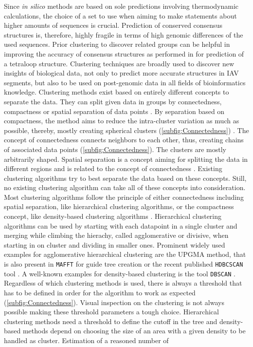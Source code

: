 \vspace{1em}

Since \textit{in silico} methods are based on sole predictions involving thermodynamic calculations, the choice of a set to use when aiming to make statements about higher amounts of sequences is crucial. Prediction of conserved consensus structures is, therefore, highly fragile in terms of high genomic differences of the used sequences. Prior clustering to discover related groups can be helpful in improving the accuracy of consensus structures as performed in \textcite{moss_identification_2011} for prediction of a tetraloop structure. Clustering techniques are broadly used to discover new insights of biological data, not only to predict more accurate structures in \gls{IAV} segments, but also to be used on post-genomic data in all fields of bioinformatics knowledge\autocite{handl_computational_2005}. Clustering methods exist based on entirely different concepts to separate the data. They can split given data in groups by connectedness, compactness or spatial separation of data points \autocite{handl_computational_2005}. By separation based on compactness, the method aims to reduce the intra-cluster variation as much as possible, thereby, mostly creating spherical clusters (\autoref{subfig:Connectedness}) \autocite{handl_computational_2005}. The concept of connectedness connects neighbors to each other, thus, creating chains of associated data points (\autoref{subfig:Connectedness}). The clusters are mostly arbitrarily shaped. Spatial separation is a concept aiming for splitting the data in different regions and is related to the concept of connectedness \autocite{handl_computational_2005}. Existing clustering algorithms try to best separate the data based on these concepts. Still, no existing clustering algorithm can take all of these concepts into consideration. Most clustering algorithms follow the principle of either connectedness including spatial separation, like hierarchical clustering algorithms, or the compactness concept, like density-based clustering algorithms \autocite{handl_computational_2005}. Hierarchical clustering algorithms can be used by starting with each datapoint in a single cluster and merging while climbing the hierachy, called agglomerative or divisive, when starting in on cluster and dividing in smaller ones. Prominent widely used examples for agglomerative hierarchical clustering are the \gls{UPGMA} method, that is also present in \texttt{MAFFT} for guide tree creation or the recent published \texttt{HDBCSCAN} tool \autocite{katoh_mafft_2002, mcinnes_hdbscan_2017}. A well-known examples for density-based clustering is the tool \texttt{DBSCAN} \autocite{madhulatha_overview_2012, schubert_dbscan_2017}. Regardless of which clustering methods is used, there is always a threshold that has to be defined in order for the algorithm to work as expected (\autoref{subfig:Connectedness}). Visual inspection on the clustering is not always possible making these threshold parameters a tough choice. Hierarchical clustering methods need a threshold to define the cutoff in the tree and density-based methods depend on choosing the size of an area with a given density to be handled as cluster. Estimation of a reasoned number of 